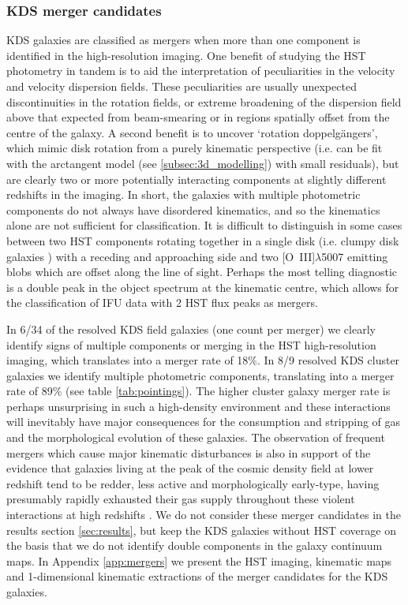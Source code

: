\documentclass[fleqn,usenatbib]{mn2e}
\begin{document}
\subsubsection{KDS merger candidates}\label{subsubsection:merger_candidates}
KDS galaxies are classified as mergers when more than one component is identified in the high-resolution imaging.  
One benefit of studying the HST photometry in tandem is to aid the interpretation of peculiarities in the velocity and velocity dispersion fields.
These peculiarities are usually unexpected discontinuities in the rotation fields, or extreme broadening of the dispersion field above that expected from beam-smearing or in regions spatially offset from the centre of the galaxy.
A second benefit is to uncover `rotation doppelg{\"a}ngers', which mimic disk rotation from a purely kinematic perspective (i.e. can be fit with the arctangent model (see \cref{subsec:3d_modelling}) with small residuals), but are clearly two or more potentially interacting components at slightly different redshifts in the imaging.
In short, the galaxies with multiple photometric components do not always have disordered kinematics, and so the kinematics alone are not sufficient for classification.
It is difficult to distinguish in some cases between two HST components rotating together in a single disk (i.e. clumpy disk galaxies \citep[e.g.][]{Elmegreen2004,Bournaud2007}) with a receding and approaching side and two [O~{\sc III}]$\lambda$5007 emitting blobs which are offset along the line of sight.
Perhaps the most telling diagnostic is a double peak in the object spectrum at the kinematic centre, which allows for the classification of IFU data with 2 HST flux peaks as mergers.

In 6/34 of the resolved KDS field galaxies (one count per merger) we clearly identify signs of multiple components or merging in the HST high-resolution imaging, which translates into a merger rate of 18\%.
In 8/9 resolved KDS cluster galaxies we identify multiple photometric components, translating into a merger rate of 89\%  (see table \ref{tab:pointings}).
The higher cluster galaxy merger rate is perhaps unsurprising in such a high-density environment and these interactions will inevitably have major consequences for the consumption and stripping of gas and the morphological evolution of these galaxies.
The observation of frequent mergers which cause major kinematic disturbances is also in support of the evidence that galaxies living at the peak of the cosmic density field at lower redshift tend to be redder, less active and morphologically early-type, having presumably rapidly exhausted their gas supply throughout these violent interactions at high redshifts \citep[e.g.][]{Steidel1998,White2007,Kodama2007,Zheng2009}.
We do not consider these merger candidates in the results section \cref{sec:results}, but keep the KDS galaxies without HST coverage on the basis that we do not identify double components in the galaxy continuum maps. 
In Appendix \cref{app:mergers} we present the HST imaging, kinematic maps and 1-dimensional kinematic extractions of the merger candidates for the KDS galaxies.
\end{document}
